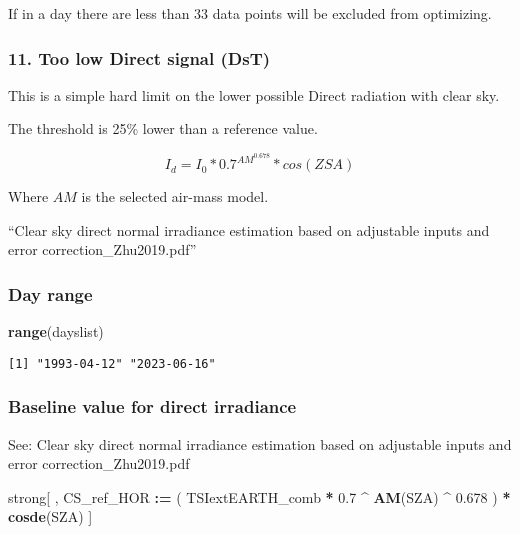 \documentclass[
  10pt,
  a4paper,oneside]{article}
\newenvironment{Shaded}{\begin{snugshade}}{\end{snugshade}}
\newcommand{\ErrorTok}[1]{\textcolor[rgb]{0.64,0.00,0.00}{\textbf{#1}}}
\newcommand{\FloatTok}[1]{\textcolor[rgb]{0.00,0.00,0.81}{#1}}
\newcommand{\KeywordTok}[1]{\textcolor[rgb]{0.13,0.29,0.53}{\textbf{#1}}}
\newcommand{\NormalTok}[1]{#1}
\newcommand{\OperatorTok}[1]{\textcolor[rgb]{0.81,0.36,0.00}{\textbf{#1}}}
\newcommand{\StringTok}[1]{\textcolor[rgb]{0.31,0.60,0.02}{#1}}
\begin{document}
If in a day there are less than 33 data points will be excluded from optimizing.

\hypertarget{too-low-direct-signal-dst}{%
\subsubsection{11. Too low Direct signal (DsT)}\label{too-low-direct-signal-dst}}

This is a simple hard limit on the lower possible Direct radiation with clear sky.

The threshold is 25\% lower than a reference value.

\[ I_d = I_0 * 0.7^{{AM}^{0.678}} * cos({ZSA}) \]

Where \({AM}\) is the selected air-mass model.

``Clear sky direct normal irradiance estimation based on adjustable inputs and error correction\_Zhu2019.pdf''

\hypertarget{day-range}{%
\subsubsection{Day range}\label{day-range}}

\begin{Shaded}
\begin{Highlighting}[]
\KeywordTok{range}\NormalTok{(dayslist)}
\end{Highlighting}
\end{Shaded}

\begin{verbatim}
[1] "1993-04-12" "2023-06-16"
\end{verbatim}

\hypertarget{baseline-value-for-direct-irradiance}{%
\subsubsection{Baseline value for direct irradiance}\label{baseline-value-for-direct-irradiance}}

See: Clear sky direct normal irradiance estimation based on adjustable inputs and error correction\_Zhu2019.pdf

\begin{Shaded}
\begin{Highlighting}[]
\NormalTok{strong[ , CS\_ref\_HOR }\OperatorTok{:}\ErrorTok{=}\StringTok{ }\NormalTok{( TSIextEARTH\_comb }\OperatorTok{*}\StringTok{ }\FloatTok{0.7} \OperatorTok{\^{}}\StringTok{ }\KeywordTok{AM}\NormalTok{(SZA) }\OperatorTok{\^{}}\StringTok{ }\FloatTok{0.678}\NormalTok{ ) }\OperatorTok{*}\StringTok{ }\KeywordTok{cosde}\NormalTok{(SZA) ]}
\end{Highlighting}
\end{Shaded}
\end{document}
